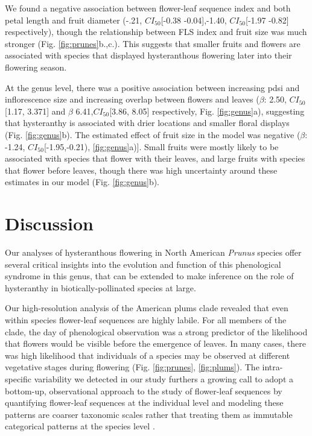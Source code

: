 \documentclass{article}[11pt]
\begin{document}
We found a negative association between flower-leaf sequence index and both petal length and fruit diameter (-.21, $CI_{50}$[-0.38 -0.04],-1.40, $CI_{50}$[-1.97 -0.82] respectively), though the relationship between FLS index and fruit size was much stronger (Fig. \ref{fig:prunes}b.,c.). This suggests that smaller fruits and flowers are associated with species that displayed hysteranthous flowering later into their flowering season.

At the genus level, there was a positive association between increasing pdsi and inflorescence size and increasing overlap between flowers and leaves  ($\beta$: 2.50, $CI_{50}$[1.17, 3.371] and $\beta$ 6.41,$CI_{50}$[3.86, 8.05] respectively, Fig. \ref{fig:genus}a), suggesting that hysteranthy is associated with drier locations and smaller floral displays (Fig. \ref{fig:genus}b). The estimated effect of fruit size in the model was negative ($\beta$: -1.24, $CI_{50}$[-1.95,-0.21), \ref{fig:genus}a)]. Small fruits were mostly likely to be associated with species that flower with their leaves, and large fruits with species that flower before leaves, though there was high uncertainty around these estimates in our model (Fig. \ref{fig:genus}b). 

\section*{Discussion}
Our analyses of hysteranthous flowering in North American \emph{Prunus} species offer several critical insights into the evolution and function of this phenological syndrome in this genus, that can be extended to make inference on the role of hysteranthy in biotically-pollinated species at large.

Our high-resolution analysis of the American plums clade revealed that even within species flower-leaf sequences are highly labile. For all members of the clade, the day of phenological observation was a strong predictor of the likelihood that flowers would be visible before the emergence of leaves. %
In many cases, there was high likelihood that individuals of a species may be observed at different vegetative stages during flowering (Fig. \ref{fig:prunes}, \ref{fig:plums}). The intra-specific variability we detected in our study furthers a growing call to adopt a bottom-up, observational approach to the study of flower-leaf sequences by quantifying flower-leaf sequences  at the individual level and modeling these patterns are coarser taxonomic scales rather that treating them as immutable categorical patterns at the species level \citep{Buonaiuto2020}.  
\end{document}
